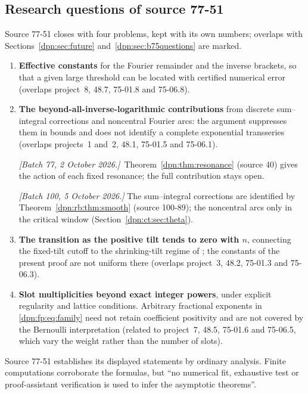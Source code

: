 \documentclass[11pt]{article}
\numberwithin{equation}{section}
\theoremstyle{definition}\newtheorem{definition}[theorem]{Definition}
\theoremstyle{remark}\newtheorem{remark}[theorem]{Remark}
\newcommand{\src}[1]{\textup{(source #1)}}
\newcommand{\writenotec}[1]{\par\smallskip\noindent\textit{[Batch 77, 2 October 2026.]}\ #1\par\smallskip}
\begin{document}
\subsection{Research questions of source 77-51}\label{dpn:fp:sec:questions}
Source 77-51 closes with four problems, kept with its own numbers; overlaps
with Sections~\ref{dpn:sec:future} and~\ref{dpn:sec:b75questions} are marked.
\begin{enumerate}[label=\textbf{77-51.\arabic*}, leftmargin=*]
\item \textbf{Effective constants} for the Fourier remainder and the inverse
  brackets, so that a given large threshold can be located with certified
  numerical error (overlaps project~8, 48.7, 75-01.8 and 75-06.8).
\item \textbf{The beyond-all-inverse-logarithmic contributions} from discrete
  sum--integral corrections and noncentral Fourier arcs: the argument
  suppresses them in bounds and does not identify a complete exponential
  transseries (overlaps projects~1 and~2, 48.1, 75-01.5 and 75-06.1).
  \writenotec{Theorem~\ref{dpn:thm:resonance} \src{40} gives the action of
  each fixed resonance; the full contribution stays open.}
  \textit{[Batch 100, 5 October 2026.]} The sum--integral corrections are
  identified by Theorem~\ref{dpn:rb:thm:smooth} \src{100-89}; the noncentral
  arcs only in the critical window (Section~\ref{dpn:ct:sec:theta}).
\item \textbf{The transition as the positive tilt tends to zero with $n$},
  connecting the fixed-tilt cutoff to the shrinking-tilt regime of
  \cite{gikunda}; the constants of the present proof are not uniform there
  (overlaps project~3, 48.2, 75-01.3 and 75-06.3).
\item \textbf{Slot multiplicities beyond exact integer powers}, under explicit
  regularity and lattice conditions.  Arbitrary fractional exponents in
  \eqref{dpn:fp:eq:family} need not retain coefficient positivity and are not
  covered by the Bernoulli interpretation (related to project~7, 48.5,
  75-01.6 and 75-06.5, which vary the weight rather than the number of slots).
\end{enumerate}
Source 77-51 establishes its displayed statements by ordinary analysis.
Finite computations corroborate the formulas, but ``no numerical fit,
exhaustive test or proof-assistant verification is used to infer the
asymptotic theorems''.

\end{document}
